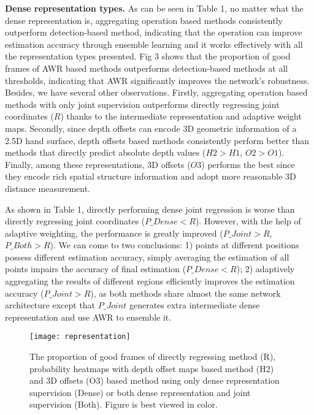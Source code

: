 \documentclass[letterpaper]{article} \usepackage{aaai20}  \usepackage{times}  \usepackage{helvet} \usepackage{courier}  \usepackage[hyphens]{url}  \usepackage{graphicx} \usepackage{amsmath}
\begin{document}
\textbf{Dense representation types.} As can be seen in Table 1, no matter what the dense representation is, aggregating operation based methods consistently outperform detection-based method, indicating that the operation can improve estimation accuracy through ensemble learning and it works effectively with all the representation types presented. Fig 3 shows that the proportion of good frames of AWR based methods outperforms detection-based methods at all thresholds, indicating that AWR significantly improves the network's robustness. Besides, we have several other observations. Firstly, aggregating operation based methods with only joint supervision outperforms directly regressing joint coordinates ($R$) thanks to the intermediate representation and adaptive weight maps. Secondly, since depth offsets can encode 3D geometric information of a 2.5D hand surface, depth offsets based methods consistently perform better than methods that directly predict absolute depth values ($H2 > H1$, $O2 > O1$). Finally, among these representations, 3D offsets ($O3$) performs the best since they encode rich spatial structure information and adopt more reasonable 3D distance measurement.

As shown in Table 1, directly performing dense joint regression is worse than directly regressing joint coordinates ($P\_Dense < R$). However, with the help of adaptive weighting, the performance is greatly improved ($P\_Joint > R$, $P\_Both > R$). We can come to two conclusions: 1) points at different positions possess different estimation accuracy, simply averaging the estimation of all points impairs the accuracy of final estimation ($P\_Dense < R$); 2) adaptively aggregating the results of different regions efficiently improves the estimation accuracy ($P\_Joint > R$), as both methods share almost the same network architecture except that $P\_Joint$ generates extra intermediate dense representation and use AWR to ensemble it. 


\begin{figure}[t]
\centering
\texttt{[image: representation]} 
\caption{The proportion of good frames of directly regressing method (R), probability heatmaps with depth offset maps based method (H2) and 3D offsets (O3) based method using only dense representation supervision (Dense) or both dense representation and joint supervision (Both). Figure is best viewed in color.}
\end{figure}
\end{document}
